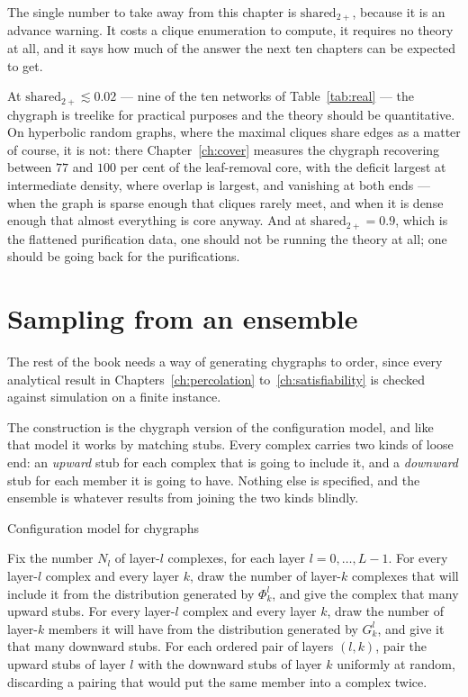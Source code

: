 The single number to take away from this chapter is $\mathrm{shared}_{2+}$,
because it is an advance warning. It costs a clique enumeration to compute, it
requires no theory at all, and it says how much of the answer the next ten
chapters can be expected to get.

At $\mathrm{shared}_{2+}\lesssim0.02$ --- nine of the ten networks of
Table~\ref{tab:real} --- the chygraph is treelike for practical purposes and the
theory should be quantitative. On hyperbolic random graphs, where the maximal
cliques share edges as a matter of course, it is not: there
Chapter~\ref{ch:cover} measures the chygraph recovering between $77$ and $100$
per cent of the leaf-removal core, with the deficit largest at intermediate
density, where overlap is largest, and vanishing at both ends --- when the graph
is sparse enough that cliques rarely meet, and when it is dense enough that
almost everything is core anyway. And at $\mathrm{shared}_{2+}=0.9$, which is
the flattened purification data, one should not be running the theory at all;
one should be going back for the purifications.

\section{Sampling from an ensemble}
\label{sec:sampling}

The rest of the book needs a way of generating chygraphs to order, since every
analytical result in
Chapters~\ref{ch:percolation} to~\ref{ch:satisfiability} is checked against
simulation on a finite instance.

The construction is the chygraph version of the configuration model, and like
that model it works by matching stubs. Every complex carries two kinds of loose
end: an \emph{upward} stub for each complex that is going to include it, and a
\emph{downward} stub for each member it is going to have. Nothing else is
specified, and the ensemble is whatever results from joining the two kinds
blindly.

\begin{model}{Configuration model for chygraphs}
\begin{rules}
 Fix the number $N_{l}$ of layer-$l$ complexes, for each layer
$l=0,\dots,L-1$.
 For every layer-$l$ complex and every layer $k$, draw the
number of layer-$k$ complexes that will include it from the distribution
generated by $\Phi^{l}_{k}$, and give the complex that many upward stubs.
 For every layer-$l$ complex and every layer $k$, draw the
number of layer-$k$ members it will have from the distribution generated by
$G^{l}_{k}$, and give it that many downward stubs.
 For each ordered pair of layers $(l,k)$, pair the upward stubs
of layer $l$ with the downward stubs of layer $k$ uniformly at random, discarding
a pairing that would put the same member into a complex twice.
\end{rules}
\end{model}

